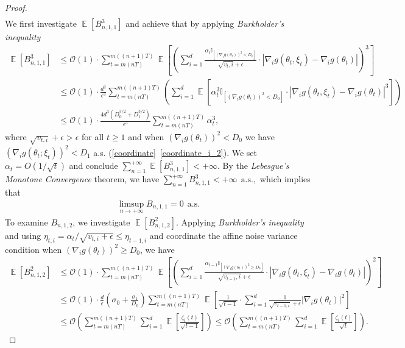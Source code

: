 \documentclass[standalone]{article}
\newcommand{\I}{\mathbb{I}}
\DeclareMathOperator{\Expect}{\mathbb{E}}
\begin{document}
\begin{proof}
\begin{align*}
\end{align*}
We first investigate $\Expect[B_{n,1,1}^{3}]$ and achieve that by applying \emph{Burkholder's inequality}
\begin{align*}
 \Expect[B_{n,1,1}^{3}]&\le \mathcal{O}(1)\cdot\sum_{t=m(nT)}^{m((n+1)T)}\Expect\left[\left(\sum_{i=1}^{d}\frac{\alpha_{t}\I_{[(\nabla_{i}g(\theta_{t}))^2<D_{0}]}}{\sqrt{v_{t},i}+\epsilon}\cdot\left|\nabla_{i} g(\theta_{t},\xi_{t})-\nabla_{i} g(\theta_{t})\right|\right)^{3}\right] \\&\le \mathcal{O}(1)\cdot\frac{d^{2}}{\epsilon^{3}}\sum_{t=m(nT)}^{m((n+1)T)}\left(\sum_{i=1}^{d}\Expect\left[{\alpha_{t}^3\I_{[(\nabla_{i}g(\theta_{t}))^2<D_{0}]}}\cdot\left|\nabla_{i} g(\theta_{t},\xi_{t})-\nabla_{i} g(\theta_{t})\right|^{3}\right]  \right) \\& \le\mathcal{O}(1)\cdot \frac{4d^{3}(D_{0}^{3/2}+D_{1}^{3/2})}{\epsilon^{3}}\sum_{t=m(nT)}^{m((n+1)T)}\alpha_{t}^{3},
\end{align*}
where $\sqrt{v_{t,i}} + \epsilon > \epsilon$ for all $t \geq 1$ and when $(\nabla_{i}g(\theta_{t}))^2<D_{0}$ we have $(\nabla_{i}g(\theta_{t}; \xi_t))^2<D_{1}$ a.s. (\cref{coordinate}~\ref{coordinate_i_2}).
We set $\alpha_t = O(1/\sqrt{t})$ and conclude $\sum_{n=1}^{+\infty}\Expect[B_{n,1,1}^{3}]<+\infty $.
By the \emph{Lebesgue's Monotone Convergence} theorem, we have
$ \sum_{n=1}^{+\infty}B_{n,1,1}^{3}<+\infty\ \ \text{a.s.},$ which implies that
\begin{align}\label{dasdwqe}
\limsup_{n\rightarrow+\infty}B_{n,1,1}=0\ \ \text{a.s.}
\end{align}
To examine $B_{n,1,2}$, we investigate $\Expect[B_{n,1,2}^{2}].$ Applying \emph{Burkholder's inequality} and using $\eta_{t,i} = \alpha_t / \sqrt{v_{t,i}+\epsilon} \leq \eta_{t-1,i}$ and coordinate the affine noise variance condition when $(\nabla_{i}g(\theta_{t}))^2\ge D_{0}$, we have
\begin{align*}
    \Expect[B_{n,1,2}^{2}]&\le \mathcal{O}(1)\cdot\sum_{t=m(nT)}^{m((n+1)T)}\Expect\left[\left(\sum_{i=1}^{d}\frac{\alpha_{t-1}\I_{[(\nabla_{i}g(\theta_{t}))^2\ge D_{0}]}}{\sqrt{v_{t-1},i}+\epsilon}\cdot\left|\nabla_{i} g(\theta_{t},\xi_{t})-\nabla_{i} g(\theta_{t})\right|\right)^{2}\right] \\&\le \mathcal{O}(1)\cdot \frac{d}{\epsilon}\left(\sigma_{0}+\frac{\sigma_{1}}{D_{0}}\right)\sum_{t=m(nT)}^{m((n+1)T)}\Expect\left[{\frac{1}{\sqrt{t-1}}}\cdot\sum_{i=1}^{d}\frac{1}{\sqrt{v_{t-1,i}}+\epsilon}\left|\nabla_{i} g(\theta_{t})\right|^{2}\right] \\&\le\mathcal{O}\left(\sum_{t=m(nT)}^{m((n+1)T)}\sum_{i=1}^{d}\Expect\left[\frac{\zeta_{i}(t)}{\sqrt{t-1}}\right]\right) \le\mathcal{O}\left(\sum_{t=m(nT)}^{m((n+1)T)}\sum_{i=1}^{d}\Expect\left[\frac{\zeta_{i}(t)}{\sqrt{t}}\right]\right).

\end{align*}
\end{proof}
\end{document}
